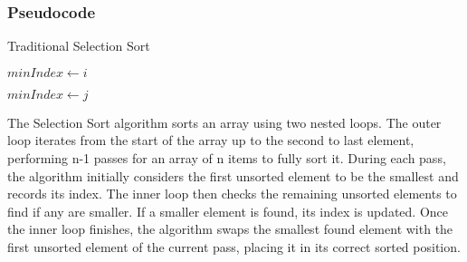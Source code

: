 \subsubsection{Pseudocode}
\begin{algorithm}
\caption{Traditional Selection Sort}
\begin{algorithmic}[1]
        \State{} $minIndex \gets i$
        
                \State{} $minIndex \gets j$
            \EndIf{}
        \EndFor{}

        \State{} 
    \EndFor{}
\EndProcedure{}
\end{algorithmic}
\end{algorithm}
The Selection Sort algorithm sorts an array using two nested loops. The outer loop iterates from the start of the array up to the second to last element, performing n-1 passes for an array of n items to fully sort it. 
During each pass, the algorithm initially considers the first unsorted element to be the smallest and records its index. The inner loop then checks the remaining unsorted elements to find if any are smaller. If a smaller element is found, its index is updated.
Once the inner loop finishes, the algorithm swaps the smallest found element with the first unsorted element of the current pass, placing it in its correct sorted position.


